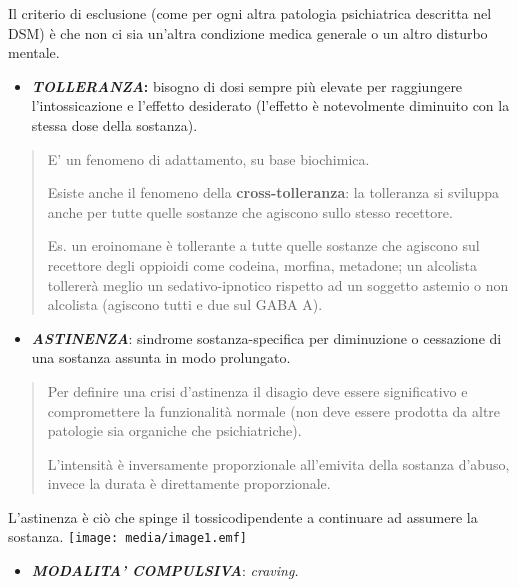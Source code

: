 \documentclass[]{article}
\begin{document}
Il criterio di esclusione (come per ogni altra patologia psichiatrica
descritta nel DSM) è che non ci sia un'altra condizione medica generale
o un altro disturbo mentale.

\begin{itemize}
\item
  \textbf{\emph{TOLLERANZA}:} bisogno di dosi sempre più elevate per
  raggiungere l'intossicazione e l'effetto desiderato (l'effetto è
  notevolmente diminuito con la stessa dose della sostanza).
\end{itemize}

\begin{quote}
E' un fenomeno di adattamento, su base biochimica.

Esiste anche il fenomeno della \textbf{cross-tolleranza}: la tolleranza
si sviluppa anche per tutte quelle sostanze che agiscono sullo stesso
recettore.

Es. un eroinomane è tollerante a tutte quelle sostanze che agiscono sul
recettore degli oppioidi come codeina, morfina, metadone; un alcolista
tollererà meglio un sedativo-ipnotico rispetto ad un soggetto astemio o
non alcolista (agiscono tutti e due sul GABA A).
\end{quote}

\begin{itemize}
\item
  \textbf{\emph{ASTINENZA}}: sindrome sostanza-specifica per diminuzione
  o cessazione di una sostanza assunta in modo prolungato.
\end{itemize}

\begin{quote}
Per definire una crisi d'astinenza il disagio deve essere significativo
e compromettere la funzionalità normale (non deve essere prodotta da
altre patologie sia organiche che psichiatriche).

L'intensità è inversamente proporzionale all'emivita della sostanza
d'abuso, invece la durata è direttamente proporzionale.
\end{quote}

L'astinenza è ciò che spinge il tossicodipendente a continuare ad
assumere la sostanza. \texttt{[image: media/image1.emf]}

\begin{itemize}
\item
  \textbf{\emph{MODALITA' COMPULSIVA}}: \emph{craving. }
\end{itemize}
\end{document}
